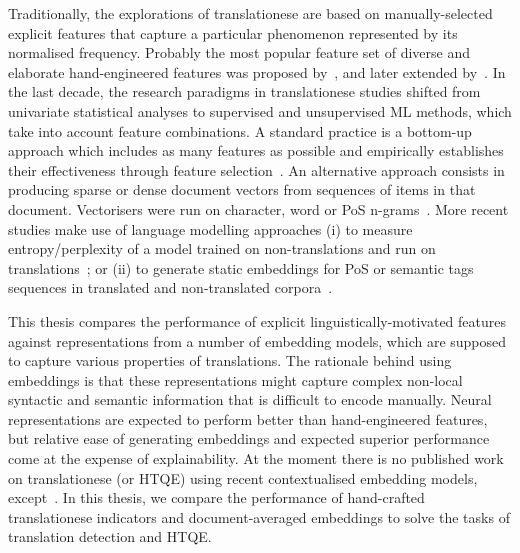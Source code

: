 Traditionally, the explorations of translationese are based on manually-selected explicit features that capture a particular phenomenon represented by its normalised frequency. Probably the most popular feature set of diverse and elaborate hand-engineered features was proposed by~\citet{Volansky2012}, and later extended by~\citet{Sominsky2019}.
In the last decade, the research paradigms in translationese studies shifted from univariate statistical analyses to supervised and unsupervised \gls*{ML} methods, which take into account feature combinations. A standard practice is a bottom-up approach which includes as many features as possible and empirically establishes their effectiveness through feature selection~\cite{Evert2017, Yuan2018}. 
An alternative approach consists in producing sparse or dense document vectors from sequences of items in that document. Vectorisers were run on character, word or \gls{PoS} n-grams~\cite{Popescu2011,Baroni2005,Carter2012,Eetemadi2015,Rabinovich2017,Lapshinova2019}. %
More recent studies make use of language modelling approaches (i) to measure entropy/perplexity of a model trained on non-translations and run on translations~\citep{Karakanta2019,Nikolaev2020}; or (ii) to generate static embeddings for \gls*{PoS} or semantic tags sequences in translated and non-translated corpora~\citep{Chowdhury2020,Chowdhury2021}. 

This thesis compares the performance of explicit linguistically-motivated features against representations from a number of embedding models, which are supposed to capture various properties of translations. 
The rationale behind using embeddings is that these representations might capture complex non-local syntactic and semantic information that is difficult to encode manually. Neural representations are expected to perform better than hand-engineered features, but relative ease of generating embeddings and expected superior performance come at the expense of explainability. 
At the moment there is no published work on translationese (or HTQE) using recent contextualised embedding models, except~\citet{Pylypenko2021}. In this thesis, we compare the performance of hand-crafted translationese indicators and document-averaged embeddings to solve the tasks of translation detection and HTQE. 

